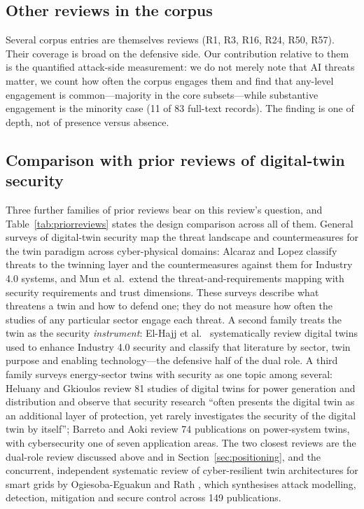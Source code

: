 \documentclass[preprint,12pt]{elsarticle}
\renewcommand{\_}{\plainunderscore\allowbreak}
\begin{document}
\subsection{Other reviews in the corpus}

Several corpus entries are themselves reviews (R1, R3, R16, R24, R50, R57). Their
coverage is broad on the defensive side. Our contribution relative to them is the quantified
attack-side measurement: we do not merely note that AI threats matter, we count how often the
corpus engages them and find that any-level engagement is common---majority in the core
subsets---while substantive engagement is the minority case (11 of 83 full-text records).
The finding is one of depth, not of presence versus absence.

\subsection{Comparison with prior reviews of digital-twin security}\label{sec:priorcompare}

Three further families of prior reviews bear on this review's question, and
Table~\ref{tab:priorreviews} states the design comparison across all of them. General
surveys of digital-twin security \cite{alcaraz2022,mun2025} map the threat landscape
and countermeasures for the twin paradigm across cyber-physical domains: Alcaraz and
Lopez classify threats to the twinning layer and the countermeasures against them for
Industry 4.0 systems, and Mun et al.\ extend the threat-and-requirements mapping with
security requirements and trust dimensions. These surveys describe what threatens a
twin and how to defend one; they do not measure how often the studies of any particular
sector engage each threat. A second family treats the twin as the security
\emph{instrument}: El-Hajj et al.\ \cite{elhajj2024} systematically review digital twins
used to enhance Industry 4.0 security and classify that literature by sector, twin
purpose and enabling technology---the defensive half of the dual role. A third family
surveys energy-sector twins with security as one topic among several: Heluany and
Gkioulos \cite{heluany2024} review 81 studies of digital twins for power generation and
distribution and observe that security research ``often presents the digital twin as an
additional layer of protection, yet rarely investigates the security of the digital twin
by itself''; Barreto and Aoki \cite{barreto2025} review 74 publications on power-system
twins, with cybersecurity one of seven application areas. The two closest reviews are
the dual-role review \cite{habeeb2026} discussed above and in
Section~\ref{sec:positioning}, and the concurrent, independent systematic review of
cyber-resilient twin architectures for smart grids by Ogiesoba-Eguakun and Rath
\cite{ogiesoba2026}, which synthesises attack modelling, detection, mitigation and
secure control across 149 publications.
\end{document}
